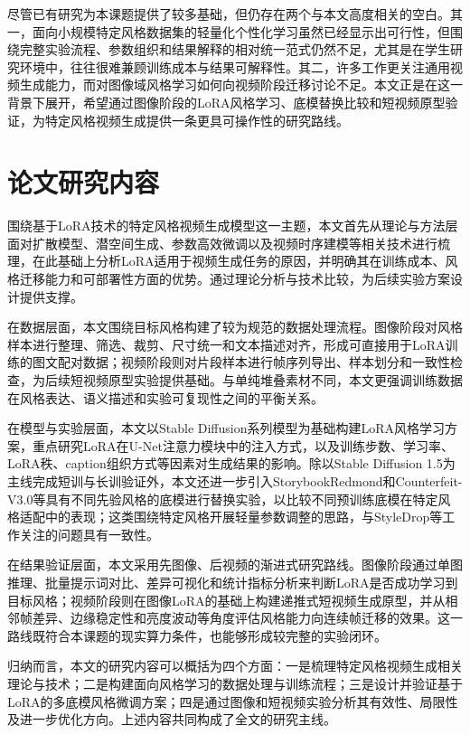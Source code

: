 尽管已有研究为本课题提供了较多基础，但仍存在两个与本文高度相关的空白。其一，面向小规模特定风格数据集的轻量化个性化学习虽然已经显示出可行性\cite{ref21}，但围绕完整实验流程、参数组织和结果解释的相对统一范式仍然不足，尤其是在学生研究环境中，往往很难兼顾训练成本与结果可解释性。其二，许多工作更关注通用视频生成能力，而对图像域风格学习如何向视频阶段迁移讨论不足\cite{ref22}。本文正是在这一背景下展开，希望通过图像阶段的LoRA风格学习、底模替换比较和短视频原型验证，为特定风格视频生成提供一条更具可操作性的研究路线。

\section{论文研究内容}

围绕基于LoRA技术的特定风格视频生成模型这一主题，本文首先从理论与方法层面对扩散模型\cite{ref1}、潜空间生成\cite{ref4}、参数高效微调\cite{ref3}以及视频时序建模\cite{ref12,ref13}等相关技术进行梳理，在此基础上分析LoRA适用于视频生成任务的原因，并明确其在训练成本、风格迁移能力和可部署性方面的优势。通过理论分析与技术比较，为后续实验方案设计提供支撑。

在数据层面，本文围绕目标风格构建了较为规范的数据处理流程。图像阶段对风格样本进行整理、筛选、裁剪、尺寸统一和文本描述对齐\cite{ref23}，形成可直接用于LoRA训练的图文配对数据；视频阶段则对片段样本进行帧序列导出、样本划分和一致性检查，为后续短视频原型实验提供基础。与单纯堆叠素材不同，本文更强调训练数据在风格表达、语义描述\cite{ref24}和实验可复现性之间的平衡关系。

在模型与实验层面，本文以Stable Diffusion系列模型为基础构建LoRA风格学习方案，重点研究LoRA在U-Net注意力模块\cite{ref25,ref26}中的注入方式，以及训练步数、学习率、LoRA秩、caption组织方式等因素对生成结果的影响。除以Stable Diffusion 1.5为主线完成短训与长训验证外，本文还进一步引入StorybookRedmond和Counterfeit-V3.0等具有不同先验风格的底模进行替换实验，以比较不同预训练底模在特定风格适配中的表现；这类围绕特定风格开展轻量参数调整的思路，与StyleDrop\cite{ref27}等工作关注的问题具有一致性。

在结果验证层面，本文采用先图像、后视频的渐进式研究路线。图像阶段通过单图推理、批量提示词对比、差异可视化和统计指标分析\cite{ref28}来判断LoRA是否成功学习到目标风格；视频阶段则在图像LoRA的基础上构建递推式短视频生成原型，并从相邻帧差异、边缘稳定性和亮度波动\cite{ref29,ref30}等角度评估风格能力向连续帧迁移的效果。这一路线既符合本课题的现实算力条件，也能够形成较完整的实验闭环。

归纳而言，本文的研究内容可以概括为四个方面：一是梳理特定风格视频生成相关理论与技术；二是构建面向风格学习的数据处理与训练流程；三是设计并验证基于LoRA的多底模风格微调方案；四是通过图像和短视频实验分析其有效性、局限性及进一步优化方向。上述内容共同构成了全文的研究主线。

